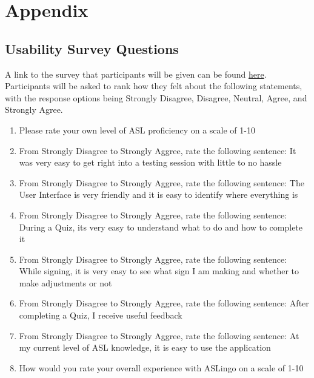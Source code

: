 \documentclass[12pt, titlepage]{article}
\begin{document}
% 
% 

\newpage{}

\section{Appendix}

\subsection{Usability Survey Questions} \label{appen}

A link to the survey that participants will be given can be found \href{https://docs.google.com/forms/d/e/1FAIpQLSelcMIJ-egkwLc7gO8MhqO35-FpTtQ6efCKnogOOKVVsrdWNA/viewform}{here}. Participants will be asked to rank how they felt about the following statements, with the response options being Strongly Disagree, Disagree, Neutral, Agree, and Strongly Agree.

\begin{enumerate}

\item Please rate your own level of ASL proficiency on a scale of 1-10 \newline [ 1 = I know absolutely nothing, 10 = I sign at a high level]
\item From Strongly Disagree to Strongly Aggree, rate the following sentence: It was very easy to get right into a testing session with little to no hassle
\item From Strongly Disagree to Strongly Aggree, rate the following sentence: The User Interface is very friendly and it is easy to identify where everything is
\item From Strongly Disagree to Strongly Aggree, rate the following sentence: During a Quiz, its very easy to understand what to do and how to complete it
\item From Strongly Disagree to Strongly Aggree, rate the following sentence: While signing, it is very easy to see what sign I am making and whether to make adjustments or not
\item From Strongly Disagree to Strongly Aggree, rate the following sentence:  After completing a Quiz,  I receive useful feedback
\item From Strongly Disagree to Strongly Aggree, rate the following sentence: At my current level of ASL knowledge, it is easy to use the application
\item How would you rate your overall experience with ASLingo on a scale of 1-10 \newline [ 1 = Terrible, 10 = Fantastic]
\end{enumerate}
\end{document}
